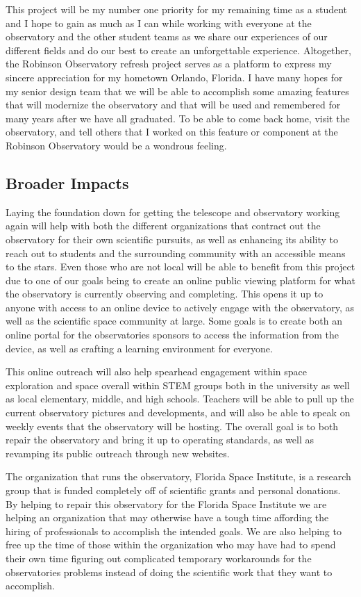 \documentclass[12pt]{report}
\begin{document}
This project will be my number one priority for my remaining time as a student and I hope to gain as much as I can while working with everyone at the observatory and the other student teams as we share our experiences of our different fields and do our best to create an unforgettable experience.  Altogether, the Robinson Observatory refresh project serves as a platform to express my sincere appreciation for my hometown Orlando, Florida. I have many hopes for my senior design team that we will be able to accomplish some amazing features that will modernize the observatory and that will be used and remembered for many years after we have all graduated.  To be able to come back home, visit the observatory, and tell others that I worked on this feature or component at the Robinson Observatory would be a wondrous feeling.

\subsection*{Broader Impacts}

Laying the foundation down for getting the telescope and observatory working again will help with both the different organizations that contract out the observatory for their own scientific pursuits, as well as enhancing its ability to reach out to students and the surrounding community with an accessible means to the stars. Even those who are not local will be able to benefit from this project due to one of our goals being to create an online public viewing platform for what the observatory is currently observing and completing. This opens it up to anyone with access to an online device to actively engage with the observatory, as well as the scientific space community at large. Some goals is to create both an online portal for the observatories sponsors to access the information from the device, as well as crafting a learning environment for everyone.

This online outreach will also help spearhead engagement within space exploration and space overall within STEM groups both in the university as well as local elementary, middle, and high schools. Teachers will be able to pull up the current observatory pictures and developments, and will also be able to speak on weekly events that the observatory will be hosting. The overall goal is to both repair the observatory and bring it up to operating standards, as well as revamping its public outreach through new websites.

The organization that runs the observatory, Florida Space Institute, is a research group that is funded completely off of scientific grants and personal donations. By helping to repair this observatory for the Florida Space Institute we are helping an organization that may otherwise have a tough time affording the hiring of professionals to accomplish the intended goals. We are also helping to free up the time of those within the organization who may have had to spend their own time figuring out complicated temporary workarounds for the observatories problems instead of doing the scientific work that they want to accomplish.
\end{document}
